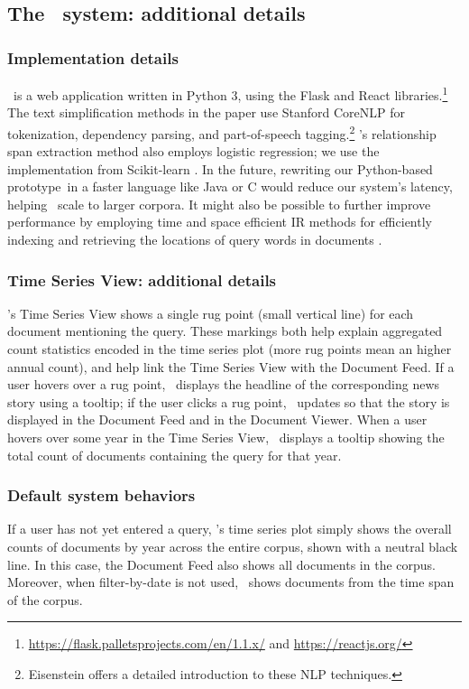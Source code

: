 \subsection*{The \ours~system: additional details}


\subsubsection*{Implementation details}
\ours~is a web application written in Python 3, using the Flask and React libraries.\footnote{\url{https://flask.palletsprojects.com/en/1.1.x/} and \url{https://reactjs.org/}} The text simplification methods in the paper use Stanford CoreNLP \cite{corenlppipeline} for tokenization, dependency parsing, and part-of-speech tagging.\footnote{Eisenstein \cite{eisenstein2019introduction} offers a detailed introduction to these NLP techniques.}  \ours's relationship span extraction method also employs logistic regression; we use the implementation from Scikit-learn \cite{Pedregosa:2011:SML:1953048.2078195}.
In the future, rewriting our Python-based prototype~in a faster language like Java or C would reduce our system's latency, helping \ours~scale to larger corpora.
It might also be possible to further improve performance by employing time and space efficient IR methods for efficiently indexing and retrieving the locations of query words in documents \cite{irbook}.

\subsubsection*{Time Series View: additional details}
\ours's {Time Series View} shows a single rug point (small vertical line) for each document mentioning the query.
These markings both help explain aggregated count statistics encoded in the time series plot (more rug points mean an higher annual count), and help link the Time Series View with the Document Feed. 
If a user hovers over a rug point, \ours~displays the headline of the corresponding news story using a tooltip; if the user clicks a rug point, \ours~updates so that the story is displayed in the Document Feed and in the Document Viewer.
When a user hovers over some year in the Time Series View, \ours~displays a tooltip showing the total count of documents containing the query for that year.

\subsubsection*{Default system behaviors}
If a user has not yet entered a query, \ours's time series plot simply shows the overall counts of documents by year across the entire corpus, shown with a neutral black line.
In this case, the Document Feed also shows all documents in the corpus. Moreover, when filter-by-date is not used, \ours~shows documents from the time span of the corpus.

